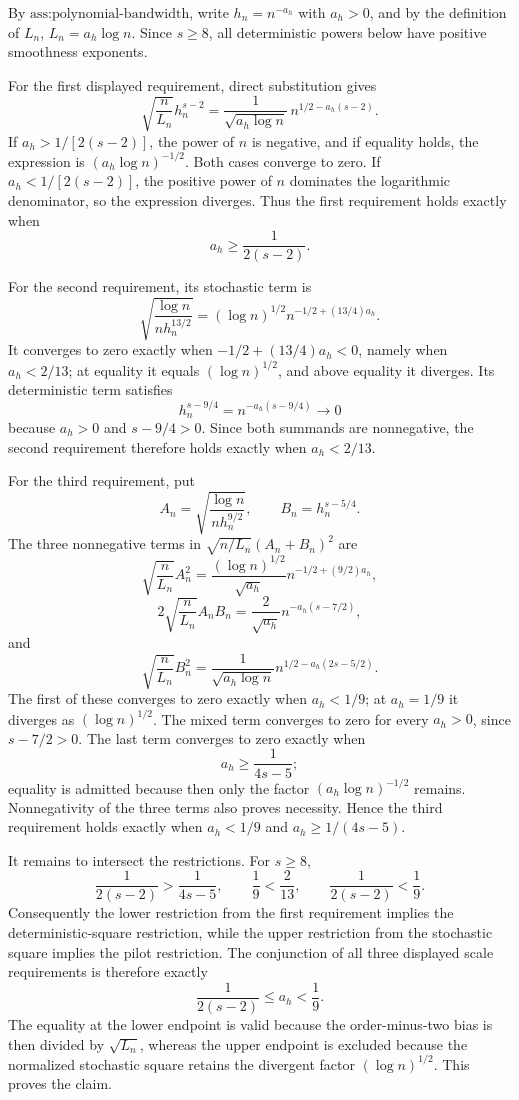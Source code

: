 By \(\text{ass:polynomial-bandwidth}\), write \(h_n=n^{-a_h}\) with \(a_h>0\), and by the definition of \(L_n\), \(L_n=a_h\log n\).  Since \(s\geq 8\), all deterministic powers below have positive smoothness exponents.

For the first displayed requirement, direct substitution gives
\[
 \sqrt{\frac{n}{L_n}}h_n^{s-2}
 =\frac{1}{\sqrt{a_h\log n}}\,n^{1/2-a_h(s-2)}.
\]
If \(a_h>1/[2(s-2)]\), the power of \(n\) is negative, and if equality holds, the expression is \((a_h\log n)^{-1/2}\).  Both cases converge to zero.  If \(a_h<1/[2(s-2)]\), the positive power of \(n\) dominates the logarithmic denominator, so the expression diverges.  Thus the first requirement holds exactly when
\[
 a_h\geq \frac{1}{2(s-2)}.
\]

For the second requirement, its stochastic term is
\[
 \sqrt{\frac{\log n}{n h_n^{13/2}}}
 = (\log n)^{1/2}n^{-1/2+(13/4)a_h}.
\]
It converges to zero exactly when \(-1/2+(13/4)a_h<0\), namely when \(a_h<2/13\); at equality it equals \((\log n)^{1/2}\), and above equality it diverges.  Its deterministic term satisfies
\[
 h_n^{s-9/4}=n^{-a_h(s-9/4)}\longrightarrow0
\]
because \(a_h>0\) and \(s-9/4>0\).  Since both summands are nonnegative, the second requirement therefore holds exactly when \(a_h<2/13\).

For the third requirement, put
\[
 A_n=\sqrt{\frac{\log n}{n h_n^{9/2}}},
 \qquad
 B_n=h_n^{s-5/4}.
\]
The three nonnegative terms in \(\sqrt{n/L_n}(A_n+B_n)^2\) are
\[
 \sqrt{\frac{n}{L_n}}A_n^2
 =\frac{(\log n)^{1/2}}{\sqrt{a_h}}
   n^{-1/2+(9/2)a_h},
\]
\[
 2\sqrt{\frac{n}{L_n}}A_nB_n
 =\frac{2}{\sqrt{a_h}}n^{-a_h(s-7/2)},
\]
and
\[
 \sqrt{\frac{n}{L_n}}B_n^2
 =\frac{1}{\sqrt{a_h\log n}}
   n^{1/2-a_h(2s-5/2)}.
\]
The first of these converges to zero exactly when \(a_h<1/9\); at \(a_h=1/9\) it diverges as \((\log n)^{1/2}\).  The mixed term converges to zero for every \(a_h>0\), since \(s-7/2>0\).  The last term converges to zero exactly when
\[
 a_h\geq \frac{1}{4s-5};
\]
equality is admitted because then only the factor \((a_h\log n)^{-1/2}\) remains.  Nonnegativity of the three terms also proves necessity.  Hence the third requirement holds exactly when \(a_h<1/9\) and \(a_h\geq1/(4s-5)\).

It remains to intersect the restrictions.  For \(s\geq8\),
\[
 \frac{1}{2(s-2)}>\frac{1}{4s-5},
 \qquad
 \frac{1}{9}<\frac{2}{13},
 \qquad
 \frac{1}{2(s-2)}<\frac{1}{9}.
\]
Consequently the lower restriction from the first requirement implies the deterministic-square restriction, while the upper restriction from the stochastic square implies the pilot restriction.  The conjunction of all three displayed scale requirements is therefore exactly
\[
 \frac{1}{2(s-2)}\leq a_h<\frac{1}{9}.
\]
The equality at the lower endpoint is valid because the order-minus-two bias is then divided by \(\sqrt{L_n}\), whereas the upper endpoint is excluded because the normalized stochastic square retains the divergent factor \((\log n)^{1/2}\).  This proves the claim.
